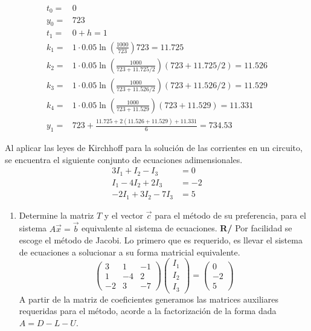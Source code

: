 \documentclass[12pt]{article}
\begin{document}
\begin{enumerate}[leftmargin=*,widest=9]
{\begin{enumerate}[label=\alph*]
\begin{eqnarray*}
t_0 =& 0\\
y_0 = &723\\
t_1 = &0 + h = 1\\
k_1 = &1 \cdot 0.05\ln \left( \frac{1000}{723} \right) 723 = 11.725\\
k_2 = &1 \cdot 0.05\ln \left( \frac{1000}{723 + 11.725/2} \right) (723 + 11.725/2) = 11.526\\
k_3 = &1 \cdot 0.05\ln \left( \frac{1000}{723 + 11.526/2} \right) (723 + 11.526/2) = 11.529\\
k_4 = &1 \cdot 0.05\ln \left( \frac{1000}{723 + 11.529} \right) (723 + 11.529) = 11.331\\
y_1 = &723 + \frac{11.725 + 2(11.526+11.529)+11.331}{6} = 734.53
\end{eqnarray*}
\end{enumerate}
   \item Al aplicar las leyes de Kirchhoff para la solución de las corrientes en un circuito, se encuentra el siguiente conjunto de ecuaciones adimensionales.
   \begin{align*}
   3I_1 + I_2 - I_3 & = 0 \\
   I_1 - 4 I_2 + 2I_3 & = -2 \\
   -2I_1 + 3I_2 -7 I_3 & = 5
   \end{align*}
   \begin{enumerate}[label=\alph*]
   \item Determine la matriz \(T\) y el vector \(\vec{c}\) para el método de su preferencia, para el sistema \(A\vec{x}=\vec{b}\) equivalente al sistema de ecuaciones.
   \textbf{R/} Por facilidad se escoge el método de Jacobi. Lo primero que es requerido, es llevar el sistema de ecuaciones a solucionar a su forma matricial equivalente.
   \[
\begin{pmatrix} 3 & 1 & -1\\ 1 & -4 & 2\\ -2 & 3 & -7 \end{pmatrix}
\begin{pmatrix} I_1 \\ I_2 \\ I_3 \end{pmatrix} = \begin{pmatrix} 0 \\ -2 \\ 5 \end{pmatrix}
   \]
   A partir de la matriz de coeficientes generamos las matrices auxiliares requeridas para el método, acorde a la factorización de la forma dada \(A = D - L - U\).

\end{enumerate}}
\end{enumerate}
\end{document}
